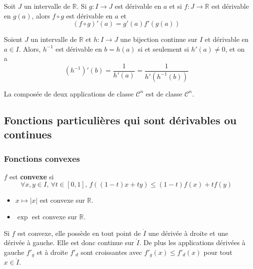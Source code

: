   \begin{proposition}
    Soit $J$ un intervalle de $\mathbb{R}$. Si $g : I \rightarrow J$ est dérivable en $a$ et si $f : J \rightarrow \mathbb{R}$ est dérivable en $g(a)$, alors $f \circ g$ est dérivable en $a$ et
    \[ (f \circ g)'(a) = g'(a) f'(g(a)) \]
  \end{proposition}

  \begin{corollary}
    Soient $J$ un intervalle de $\mathbb{R}$ et $h : I \rightarrow J$ une bijection continue sur $I$ et dérivable en $a \in I$. Alors, $h^{-1}$ est dérivable en $b = h(a)$ si et seulement si $h'(a) \neq 0$, et on a
    \[ (h^{-1})'(b) = \frac{1}{h'(a)} = \frac{1}{h'(h^{-1}(b))} \]
  \end{corollary}

  \begin{corollary}
    La composée de deux applications de classe $\mathcal{C}^n$ est de classe $\mathcal{C}^n$.
  \end{corollary}

  \subsection{Fonctions particulières qui sont dérivables ou continues}

  \subsubsection{Fonctions convexes}


  \begin{definition}
    $f$ est \textbf{convexe} si
    \[ \forall x, y \in I, \, \forall t \in [0,1], \, f((1-t)x + ty) \leq (1-t)f(x) + tf(y) \]
  \end{definition}

  \begin{example}
    \begin{itemize}
      \item $x \mapsto \vert x \vert$ est convexe sur $\mathbb{R}$.
      \item $\exp$ est convexe sur $\mathbb{R}$.
    \end{itemize}
  \end{example}


  \begin{proposition}
    Si $f$ est convexe, elle possède en tout point de $\mathring{I}$ une dérivée à droite et une dérivée à gauche. Elle est donc continue sur $\mathring{I}$. De plus les applications dérivées à gauche $f'_g$ et à droite $f'_d$ sont croissantes avec $f'_g(x) \leq f'_d(x)$ pour tout $x \in \mathring{I}$.
  \end{proposition}

